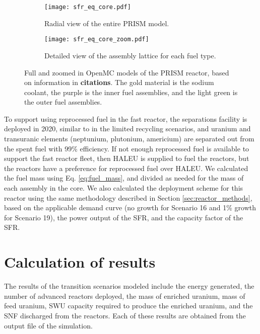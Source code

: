 \begin{figure}[h!]
    \centering
    \begin{subfigure}[b]{0.48\textwidth}
        \centering
        \texttt{[image: sfr\_eq\_core.pdf]}
        \caption{Radial view of the entire PRISM model.}
        \label{fig:prism_lattice}
    \end{subfigure}
    \hfill
    \begin{subfigure}[b]{0.48\textwidth}
        \centering
        \texttt{[image: sfr\_eq\_core\_zoom.pdf]}
        \caption{Detailed view of the assembly lattice for each 
        fuel type.}
        \label{fig:prism_lattice_zoom}
    \end{subfigure}
    \hfill            
    \caption{Full and zoomed in OpenMC models of the PRISM reactor, based 
    on information in \textbf{citations}. The gold material is the 
    sodium coolant, the purple is the inner fuel assemblies, and the 
    light green is the outer fuel assemblies. }
    \label{fig:prism_model}
\end{figure}

To support using reprocessed fuel in the fast reactor, 
the separations facility is deployed in 2020, similar to in the 
limited recycling scenarios, and uranium and transuranic elements 
(neptunium, plutonium, americium) are separated out from 
the spent fuel with 99\% efficiency. If not enough reprocessed fuel is 
available to support the fast reactor fleet, then \gls{HALEU} is supplied
to fuel the reactors, but the reactors have a preference for reprocessed 
fuel over \gls{HALEU}. We calculated the fuel mass using Eq. \ref{eq:fuel_mass},
and divided as needed for the mass of each assembly in the core. 
We also calculated the deployment scheme for this reactor using the 
same methodology described in Section \ref{sec:reactor_methods}, based on 
the applicable demand curve (no growth for Scenario 16 and 1\% growth 
for Scenario 19), the power output of the \gls{SFR}, and the capacity 
factor of the \gls{SFR}.

\section{Calculation of results} \label{sec:results_calc}
The results of the transition scenarios modeled include the energy generated, 
the number of advanced reactors deployed, the mass of enriched uranium, 
mass of feed uranium, \gls{SWU} capacity required to produce the enriched 
uranium, and the \gls{SNF} discharged from the reactors. Each of these results 
are obtained from the \Cyclus output file of the simulation. 

